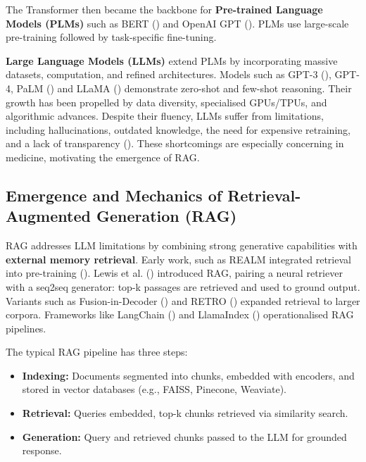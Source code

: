 The Transformer then became the backbone for \textbf{Pre-trained Language Models (PLMs)} such as BERT (\citep{devlin2019bert}) and OpenAI GPT (\citep{radford2019language}). PLMs use large-scale pre-training followed by task-specific fine-tuning.

\textbf{Large Language Models (LLMs)} extend PLMs by incorporating massive datasets, computation, and refined architectures. Models such as GPT-3 (\citep{brown2020language}), GPT-4, PaLM (\citep{chowdhery2022palm}) and LLaMA (\citep{touvron2023llama}) demonstrate zero-shot and few-shot reasoning. Their growth has been propelled by data diversity, specialised GPUs/TPUs, and algorithmic advances. Despite their fluency, LLMs suffer from limitations, including hallucinations, outdated knowledge, the need for expensive retraining, and a lack of transparency (\citep{ji2023survey}). These shortcomings are especially concerning in medicine, motivating the emergence of RAG.

\subsection{Emergence and Mechanics of Retrieval-Augmented Generation (RAG)}

RAG addresses LLM limitations by combining strong generative capabilities with \textbf{external memory retrieval}. Early work, such as REALM integrated retrieval into pre-training (\citep{guu2020realm}). Lewis et al. (\citeyear{lewis2020rag}) introduced RAG, pairing a neural retriever with a seq2seq generator: top-k passages are retrieved and used to ground output. Variants such as Fusion-in-Decoder (\citep{izacard2021leveraging}) and RETRO (\citep{borgeaud2022retro}) expanded retrieval to larger corpora. Frameworks like LangChain (\citep{langchain2023}) and LlamaIndex (\citep{llamaindex2023}) operationalised RAG pipelines.

The typical RAG pipeline has three steps:
\begin{itemize}
  \item \textbf{Indexing:} Documents segmented into chunks, embedded with encoders, and stored in vector databases (e.g., FAISS, Pinecone, Weaviate).
  \item \textbf{Retrieval:} Queries embedded, top-k chunks retrieved via similarity search.
  \item \textbf{Generation:} Query and retrieved chunks passed to the LLM for grounded response.
\end{itemize}

